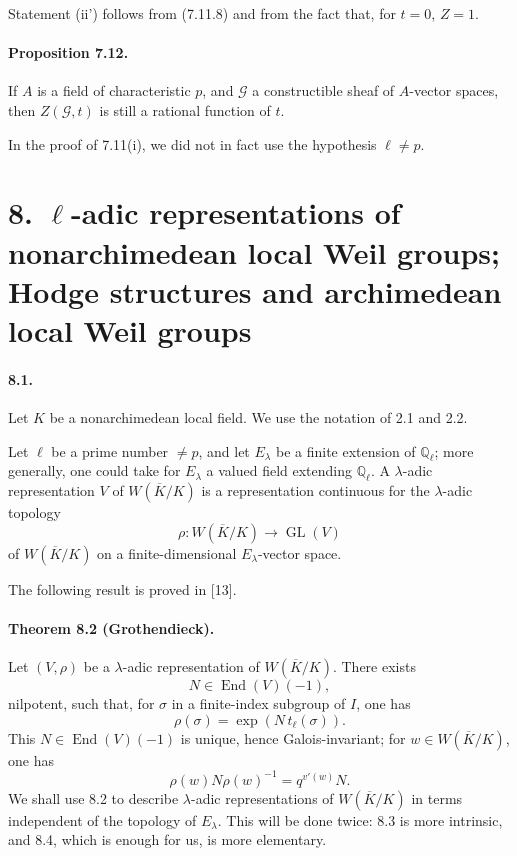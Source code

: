 \documentclass[10pt,letterpaper]{article}
\newcommand{\GL}{\operatorname{GL}}
\providecommand{\GL}{\operatorname{GL}}
\providecommand{\End}{\operatorname{End}}
\providecommand{\GL}{\operatorname{GL}}
\providecommand{\End}{\operatorname{End}}
\begin{document}
Statement (ii') follows from (7.11.8) and from the fact that, for \(t=0\), \(Z=1\).

\paragraph{Proposition 7.12.} If \(A\) is a field of characteristic \(p\), and \(\mathcal G\) a constructible sheaf of \(A\)-vector spaces, then \(Z(\mathcal G,t)\) is still a rational function of \(t\).

In the proof of 7.11(i), we did not in fact use the hypothesis \(\ell\ne p\).

\section*{8. \(\ell\)-adic representations of nonarchimedean local Weil groups; Hodge structures and archimedean local Weil groups}

\paragraph{8.1.} Let \(K\) be a nonarchimedean local field. We use the notation of 2.1 and 2.2.

Let \(\ell\) be a prime number \(\ne p\), and let \(E_\lambda\) be a finite extension of \(\mathbb Q_\ell\); more generally, one could take for \(E_\lambda\) a valued field extending \(\mathbb Q_\ell\). A \(\lambda\)-adic representation \(V\) of \(W(\overline K/K)\) is a representation continuous for the \(\lambda\)-adic topology
\[
\rho:W(\overline K/K)\longrightarrow\GL(V)
\]
of \(W(\overline K/K)\) on a finite-dimensional \(E_\lambda\)-vector space.

The following result is proved in [13].

\paragraph{Theorem 8.2 (Grothendieck).} Let \((V,\rho)\) be a \(\lambda\)-adic representation of \(W(\overline K/K)\). There exists
\[
N\in\End(V)(-1),
\]
nilpotent, such that, for \(\sigma\) in a finite-index subgroup of \(I\), one has
\[
\rho(\sigma)=\exp(N\,t_\ell(\sigma)).
\]
This \(N\in\End(V)(-1)\) is unique, hence Galois-invariant; for \(w\in W(\overline K/K)\), one has
\[
\rho(w)N\rho(w)^{-1}=q^{v'(w)}N.
\]
We shall use 8.2 to describe \(\lambda\)-adic representations of \(W(\overline K/K)\) in terms independent of the topology of \(E_\lambda\). This will be done twice: 8.3 is more intrinsic, and 8.4, which is enough for us, is more elementary.
\end{document}
